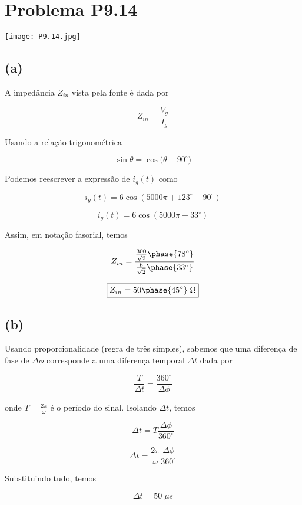 
\section*{Problema P9.14}

\renewcommand*\thesection{9.14}

\begin{center}
    \texttt{[image: P9.14.jpg]}
\end{center}

\subsection*{(a)}

A impedância \(Z_{in}\) vista pela fonte é dada por

\begin{equation}\label{eq:9.14.1}
    Z_{in} = \frac{V_g}{I_g}
\end{equation}

Usando a relação trigonométrica 

\[  \sin{\theta} = \cos({\theta - 90^{\circ})}  \]

Podemos reescrever a expressão de \(i_g(t)\) como

\[ i_g(t) = 6\cos({5000\pi + 123^{\circ} - 90^{\circ}})  \]

\[ i_g(t) = 6\cos({5000\pi + 33^{\circ}})  \]

Assim, em notação fasorial, temos 

\begin{equation}\label{eq:9.14.2}
    Z_{in} = \frac{\frac{300}{\sqrt{2}}\phase{78^{\circ}}}{\frac{6}{\sqrt{2}}\phase{33^{\circ}}}
\end{equation}

\[ \boxed{Z_{in} = 50\phase{45^{\circ}} \; \Omega}  \]

\subsection*{(b)}

Usando proporcionalidade (regra de três simples), sabemos que uma 
diferença de fase de \(\Delta \phi \) corresponde a uma diferença 
temporal \(\Delta t \) dada por    


\[ \frac{T}{\Delta t} = \frac{360^{\circ}}{\Delta \phi}  \]

onde \(T = \frac{2\pi}{\omega} \) é o período do sinal. Isolando \(\Delta t \), temos

\begin{equation}\label{eq:9.14.3}
    \Delta t = T \frac{\Delta \phi}{360^{\circ}}
\end{equation}

\[  \Delta t = \frac{2\pi}{\omega} \frac{\Delta \phi}{360^{\circ}}  \]

Substituindo tudo, temos

\[ \boxed{\Delta t = 50 \; \mu s}  \]
